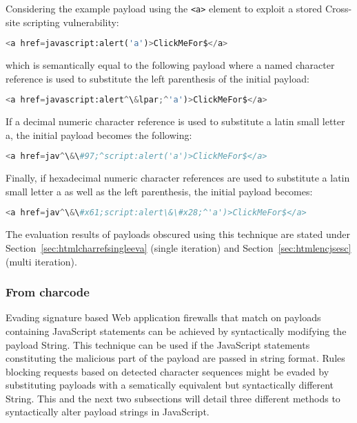 Considering the example payload using the \verb|<a>| element to exploit a stored Cross-site scripting vulnerability:

\begin{lstlisting}[style=basicStyle, language=Python, escapeinside=\^\^]
<a href=javascript:alert('a')>ClickMeFor$</a>
\end{lstlisting}

which is semantically equal to the following payload where a named character reference is used to substitute the left parenthesis of the initial payload:

\begin{lstlisting}[style=basicStyle, language=Python, escapeinside=\^\^]
<a href=javascript:alert^\&lpar;^'a')>ClickMeFor$</a>
\end{lstlisting}

If a decimal numeric character reference is used to substitute a latin small letter a, the initial payload becomes the following:

\begin{lstlisting}[style=basicStyle, language=Python, escapeinside=\^\^]
<a href=jav^\&\#97;^script:alert('a')>ClickMeFor$</a>
\end{lstlisting}

Finally, if hexadecimal numeric character references are used to substitute a latin small letter a as well as the left parenthesis, the initial payload becomes:

\begin{lstlisting}[style=basicStyle, language=Python, escapeinside=\^\^]
<a href=jav^\&\#x61;script:alert\&\#x28;^'a')>ClickMeFor$</a>
\end{lstlisting}

The evaluation results of payloads obscured using this technique are stated under Section~\ref{sec:htmlcharrefsingleeva} (single iteration) and Section~\ref{sec:htmlencjsesc} (multi iteration).

\subsubsection{From charcode}
\label{sec:fromcharcodetech}
Evading signature based Web application firewalls that match on payloads containing JavaScript statements can be achieved by syntactically modifying the payload String. This technique can be used if the JavaScript statements constituting the malicious part of the payload are passed in string format. Rules blocking requests based on detected character sequences might be evaded by substituting payloads with a sematically equivalent but syntactically different String. This and the next two subsections will detail three different methods to syntactically alter payload strings in JavaScript.

